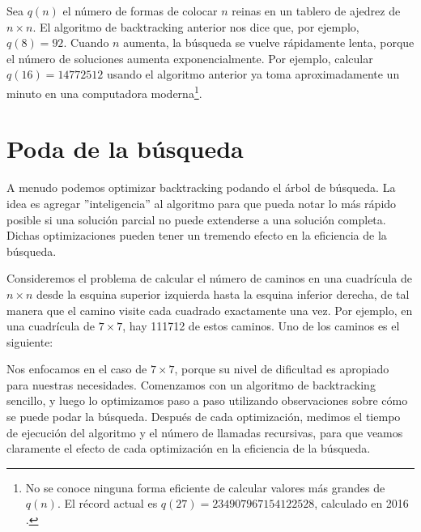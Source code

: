 Sea $q(n)$ el número de formas de
colocar $n$ reinas en un tablero de ajedrez de $n \times n$.
El algoritmo de backtracking anterior nos dice que, por ejemplo, $q(8)=92$.
Cuando $n$ aumenta, la búsqueda se vuelve rápidamente lenta,
porque el número de soluciones aumenta
exponencialmente.
Por ejemplo, calcular $q(16)=14772512$
usando el algoritmo anterior ya toma aproximadamente un minuto
en una computadora moderna\footnote{No se conoce ninguna forma eficiente de
calcular valores más grandes de $q(n)$. El récord actual es
$q(27)=234907967154122528$, calculado en 2016 \cite{q27}.}.

\section{Poda de la búsqueda}

A menudo podemos optimizar backtracking podando el árbol de búsqueda.
La idea es agregar ''inteligencia'' al algoritmo
para que pueda notar lo más rápido posible
si una solución parcial no puede extenderse
a una solución completa.
Dichas optimizaciones pueden tener un tremendo
efecto en la eficiencia de la búsqueda.

Consideremos el problema
de calcular el número de caminos
en una cuadrícula de $n \times n$ desde la esquina superior izquierda
hasta la esquina inferior derecha, de tal manera que
el camino visite cada cuadrado exactamente una vez.
Por ejemplo, en una cuadrícula de $7 \times 7$,
hay 111712 de estos caminos.
Uno de los caminos es el siguiente:

\begin{center}
\end{center}

Nos enfocamos en el caso de $7 \times 7$,
porque su nivel de dificultad es apropiado para nuestras necesidades.
Comenzamos con un algoritmo de backtracking sencillo,
y luego lo optimizamos paso a paso utilizando observaciones
sobre cómo se puede podar la búsqueda.
Después de cada optimización, medimos el tiempo de ejecución
del algoritmo y el número de llamadas recursivas,
para que veamos claramente el efecto de cada
optimización en la eficiencia de la búsqueda.

